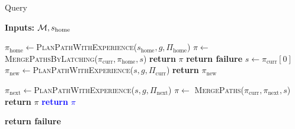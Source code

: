 \documentclass[a4paper]{report}
\begin{document}
\begin{algorithm}[t]
\caption{Query}\label{alg:query}  
\hspace*{\algorithmicindent} \textbf{Inputs:} $\mathcal{M}, s_{\textrm{home}}$
\begin{algorithmic}[1]
 
            \State $\pi_{\textrm{home}} \leftarrow$\textsc{PlanPathWithExperience}($s_{\textrm{home}},g,\Pi_{\textrm{home}}$)
            \State $\pi \leftarrow$ \textsc{MergePathsByLatching}($\pi_{\textrm{curr}},\pi_{\textrm{home}}, s$)
            \State \textbf{return} $\pi$
            \label{alg:query:line:c3b}
        \EndIf
    \EndIf
\State \textbf{return failure}
\EndProcedure
\vspace{2mm}
    \State $s \leftarrow \pi_{\textrm{curr}}[0]$    
     
        \State $\pi_{\textrm{new}} \leftarrow$\textsc{PlanPathWithExperience}($s,g,\Pi_{\textrm{curr}}$)
        \State \textbf{return} $\pi_{\textrm{new}}$
    \EndIf
     
        \label{alg:query:line:c2a}
         
     
        \State $\pi_{\textrm{next}} \leftarrow$\textsc{PlanPathWithExperience}($s,g,\Pi_{\textrm{next}}$)
        \State $\pi \leftarrow$ \textsc{MergePaths}($\pi_{\textrm{curr}},\pi_{\textrm{next}},s$)
        \State \textbf{return} $\pi$
        \label{alg:query:line:c2b}
    \EndIf
%
%
    \textcolor{blue}{
        \State \textbf{return} $\pi$
    \EndIf
    }

\EndFor
    \State \textbf{return failure} 
\EndProcedure
\end{algorithmic}
\end{algorithm}
\end{document}
